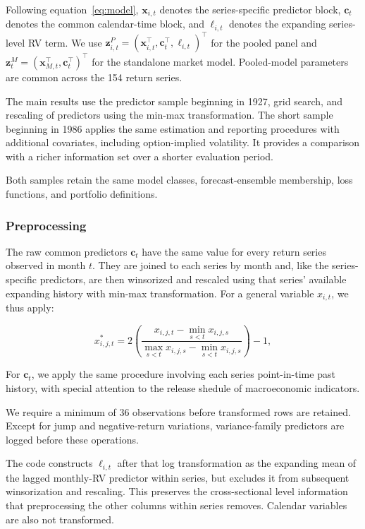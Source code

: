 \documentclass[preprint,12pt,authoryear]{elsarticle}
\begin{document}
\begin{appendices}
Following equation~\eqref{eq:model}, $\mathbf{x}_{i,t}$ denotes the
series-specific predictor block, $\mathbf{c}_t$ denotes the common
calendar-time block, and $\ell_{i,t}$ denotes the expanding series-level RV
term. We use $\mathbf{z}^{P}_{i,t}=(\mathbf{x}_{i,t}^{\top},
\mathbf{c}_{t}^{\top},\ell_{i,t})^{\top}$ for the pooled panel and
$\mathbf{z}^{M}_{t}=(\mathbf{x}_{M,t}^{\top},\mathbf{c}_{t}^{\top})^{\top}$
for the standalone market model. Pooled-model parameters are common across the
154 return series. 

The main results use the predictor sample beginning in 1927, grid search, and rescaling of predictors using the min-max transformation. The short sample beginning in 1986 applies the same estimation and reporting procedures with additional covariates, including option-implied volatility. It provides a comparison with a richer information set over a shorter evaluation period.

Both samples retain the same model classes, forecast-ensemble membership, loss functions, and portfolio definitions.

\subsubsection{Preprocessing}

The raw common predictors $\mathbf{c}_t$ have the same value for every return
series observed in month $t$. They are joined to each series by month and, like
the series-specific predictors, are then winsorized and rescaled using that
series' available expanding history with min-max transformation. For a general variable $x_{i,t}$, we thus apply:

\[
x^{*}_{i,j,t}
=
2\left(
\frac{x_{i,j,t}-\min_{s<t}x_{i,j,s}}
{\max_{s<t}x_{i,j,s}-\min_{s<t}x_{i,j,s}}
\right)-1,
\]

For $\mathbf{c}_t$, we apply the same procedure involving each series point-in-time past history, with special attention to the release shedule of macroeconomic indicators.

We require a minimum of 36 observations before transformed rows are retained. Except for jump and negative-return variations, variance-family predictors
are logged before these operations.

The code constructs $\ell_{i,t}$ after that
log transformation as the expanding mean of the lagged monthly-RV predictor
within series, but excludes it from subsequent winsorization and rescaling. This
preserves the cross-sectional level information that preprocessing the other
columns within series removes. Calendar variables are also not transformed.


\end{appendices}
\end{document}
